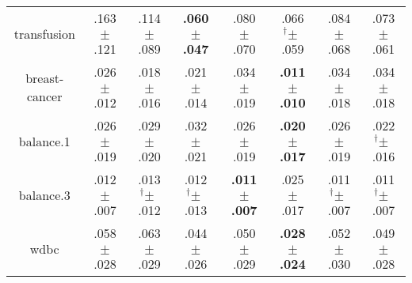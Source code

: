 \begin{tabular}{|c|ccccccc|}
transfusion & .163$^{\phantom{\dag}}\pm^{\phantom{\dag}}$.121\cellcolor{red!40} & .114$^{\phantom{\dag}}\pm^{\phantom{\dag}}$.089\cellcolor{red!1} & \textbf{.060$^{\phantom{\dag}}\pm^{\phantom{\dag}}$.047}\cellcolor{green!40} & .080$^{\phantom{\dag}}\pm^{\phantom{\dag}}$.070\cellcolor{green!24} & .066$^{\dag}\pm^{\phantom{\dag}}$.059\cellcolor{green!35} & .084$^{\phantom{\dag}}\pm^{\phantom{\dag}}$.068\cellcolor{green!22} & .073$^{\phantom{\dag}}\pm^{\phantom{\dag}}$.061\cellcolor{green!30} \\
breast-cancer & .026$^{\phantom{\dag}}\pm^{\phantom{\dag}}$.012\cellcolor{red!11} & .018$^{\phantom{\dag}}\pm^{\phantom{\dag}}$.016\cellcolor{green!15} & .021$^{\phantom{\dag}}\pm^{\phantom{\dag}}$.014\cellcolor{green!6} & .034$^{\phantom{\dag}}\pm^{\phantom{\dag}}$.019\cellcolor{red!39} & \textbf{.011$^{\phantom{\dag}}\pm^{\phantom{\dag}}$.010}\cellcolor{green!40} & .034$^{\phantom{\dag}}\pm^{\phantom{\dag}}$.018\cellcolor{red!39} & .034$^{\phantom{\dag}}\pm^{\phantom{\dag}}$.018\cellcolor{red!40} \\
balance.1 & .026$^{\phantom{\dag}}\pm^{\phantom{\dag}}$.019\cellcolor{green!0} & .029$^{\phantom{\dag}}\pm^{\phantom{\dag}}$.020\cellcolor{red!17} & .032$^{\phantom{\dag}}\pm^{\phantom{\dag}}$.021\cellcolor{red!40} & .026$^{\phantom{\dag}}\pm^{\phantom{\dag}}$.019\cellcolor{green!1} & \textbf{.020$^{\phantom{\dag}}\pm^{\phantom{\dag}}$.017}\cellcolor{green!40} & .026$^{\phantom{\dag}}\pm^{\phantom{\dag}}$.019\cellcolor{green!1} & .022$^{\dag}\pm^{\phantom{\dag}}$.016\cellcolor{green!29} \\
balance.3 & .012$^{\phantom{\dag}}\pm^{\phantom{\dag}}$.007\cellcolor{green!31} & .013$^{\dag}\pm^{\phantom{\dag}}$.012\cellcolor{green!29} & .012$^{\dag}\pm^{\phantom{\dag}}$.013\cellcolor{green!34} & \textbf{.011$^{\phantom{\dag}}\pm^{\phantom{\dag}}$.007}\cellcolor{green!40} & .025$^{\phantom{\dag}}\pm^{\phantom{\dag}}$.017\cellcolor{red!40} & .011$^{\dag}\pm^{\phantom{\dag}}$.007\cellcolor{green!39} & .011$^{\dag}\pm^{\phantom{\dag}}$.007\cellcolor{green!37} \\
wdbc & .058$^{\phantom{\dag}}\pm^{\phantom{\dag}}$.028\cellcolor{red!29} & .063$^{\phantom{\dag}}\pm^{\phantom{\dag}}$.029\cellcolor{red!40} & .044$^{\phantom{\dag}}\pm^{\phantom{\dag}}$.026\cellcolor{green!4} & .050$^{\phantom{\dag}}\pm^{\phantom{\dag}}$.029\cellcolor{red!11} & \textbf{.028$^{\phantom{\dag}}\pm^{\phantom{\dag}}$.024}\cellcolor{green!40} & .052$^{\phantom{\dag}}\pm^{\phantom{\dag}}$.030\cellcolor{red!15} & .049$^{\phantom{\dag}}\pm^{\phantom{\dag}}$.028\cellcolor{red!8} \\

\end{tabular}
